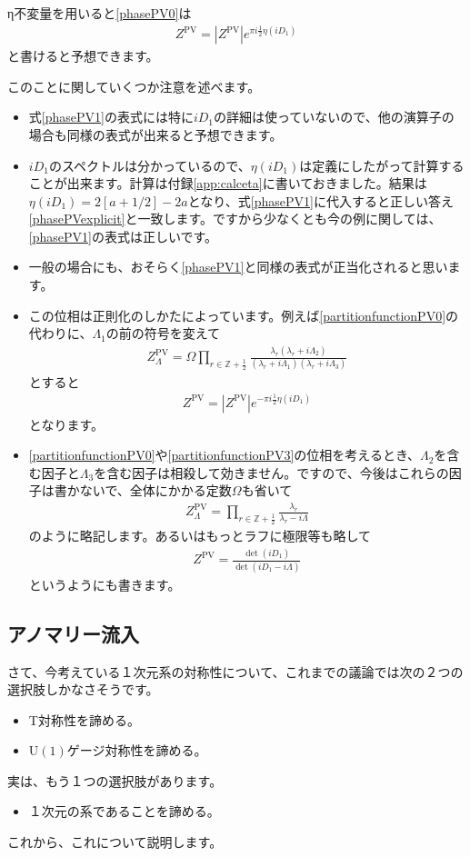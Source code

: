 \documentclass[paper=a4, fontsize=12pt, line_length=16cm, number_of_lines=33,dvipdfmx]{jlreq}
\numberwithin{equation}{section}
\newcommand{\Zb}{\mathbb{Z}}
\newcommand{\halfint}{\Zb+\frac{1}{2}}
\newcommand{\U}{\mathrm{U}}
\newcommand{\ZPV}{Z^{\mathrm{PV}}}
\begin{document}
η不変量を用いると\eqref{phasePV0}は
\begin{align}
  \ZPV=|\ZPV|e^{\pi i\frac{1}{2}\eta(iD_1)}\label{phasePV1}
\end{align}
と書けると予想できます。

このことに関していくつか注意を述べます。
\begin{itemize}
  \item 式\eqref{phasePV1}の表式には特に$iD_1$の詳細は使っていないので、他の演算子の場合も同様の表式が出来ると予想できます。
  \item $iD_1$のスペクトルは分かっているので、$\eta(iD_1)$は定義にしたがって計算することが出来ます。計算は付録\ref{app:calceta}に書いておきました。結果は$\eta(iD_1)=2[a+1/2]-2a$となり、式\eqref{phasePV1}に代入すると正しい答え\eqref{phasePVexplicit}と一致します。ですから少なくとも今の例に関しては、\eqref{phasePV1}の表式は正しいです。
  \item 一般の場合にも、おそらく\eqref{phasePV1}と同様の表式が正当化されると思います。
  \item この位相は正則化のしかたによっています。例えば\eqref{partitionfunctionPV0}の代わりに、$\Lambda_1$の前の符号を変えて
  \begin{align}
    \ZPV_{\Lambda}=\Omega \prod_{r\in \halfint}\frac{\lambda_r(\lambda_r+i\Lambda_2)}{(\lambda_r+i\Lambda_1)(\lambda_r+i\Lambda_3)}\label{partitionfunctionPV3}
  \end{align}
  とすると
  \begin{align}
    \ZPV=|\ZPV|e^{-\pi i\frac{1}{2}\eta(iD_1)}
  \end{align}
  となります。
  \item \eqref{partitionfunctionPV0}や\eqref{partitionfunctionPV3}の位相を考えるとき、$\Lambda_2$を含む因子と$\Lambda_3$を含む因子は相殺して効きません。ですので、今後はこれらの因子は書かないで、全体にかかる定数$\Omega$も省いて
  \begin{align}
    \ZPV_{\Lambda}=\prod_{r\in \halfint}\frac{\lambda_r}{\lambda_r-i\Lambda}
  \end{align}
  のように略記します。あるいはもっとラフに極限等も略して
  \begin{align}
    \ZPV=\frac{\det(iD_1)}{\det(iD_1-i\Lambda)}
  \end{align}
  というようにも書きます。
\end{itemize}

\subsection{アノマリー流入}\label{subsec:anomalyinflow}
さて、今考えている１次元系の対称性について、これまでの議論では次の２つの選択肢しかなさそうです。
\begin{itemize}
  \item T対称性を諦める。
  \item $\U(1)$ゲージ対称性を諦める。
\end{itemize}
実は、もう１つの選択肢があります。
\begin{itemize}
  \item １次元の系であることを諦める。
\end{itemize}
これから、これについて説明します。
\end{document}
